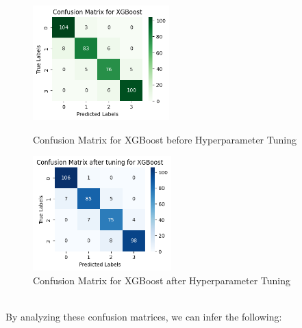 \documentclass[12pt]{report}
\begin{document}
\begin{figure}[H]
    \centering
		\begin{minipage}{0.45\textwidth}
			\centering
			\includegraphics[height=12em]{cmat_XG.png}
			\caption{Confusion Matrix for XGBoost before Hyperparameter Tuning}
			\label{cmat_XG}
		\end{minipage}
    \hfill
    \begin{minipage}{0.45\textwidth}
        \centering
        \includegraphics[height=12em]{cmat_tuned_XG.png}
        \caption{Confusion Matrix for XGBoost after Hyperparameter Tuning}
        \label{cmat_tuned_XG}
    \end{minipage}
\end{figure}
$ $\\
\noindent By analyzing these confusion matrices, we can infer the following:
\end{document}
